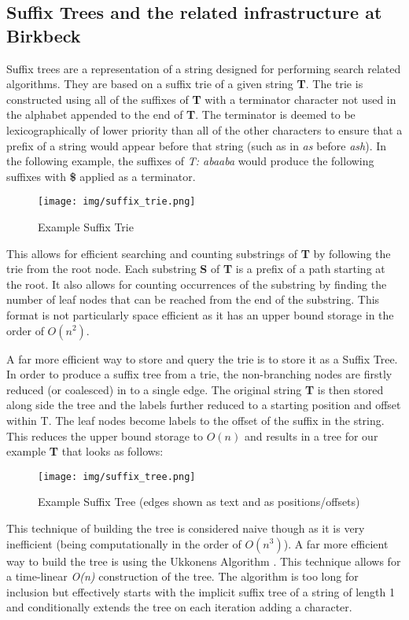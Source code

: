 \documentclass[11pt]{scrartcl}
\begin{document}
\subsection{Suffix Trees and the related infrastructure at Birkbeck}
	Suffix trees \citep{suffix} are a representation of a string designed for performing search related algorithms.  They are based on a suffix trie of a given string \textbf{T}.  The trie is constructed using all of the suffixes of \textbf{T} with a terminator character not used in the alphabet appended to the end of \textbf{T}.  The terminator is deemed to be lexicographically of lower priority than all of the other characters to ensure that a prefix of a string would appear before that string (such as in \textit{as} before \textit{ash}). In the following example, the suffixes of \textit{T: abaaba} would produce the following suffixes with \textbf{\$} applied as a terminator.
	\begin{figure}[h]
		\centering
		\texttt{[image: img/suffix\_trie.png]}
		\caption{Example Suffix Trie}
	\end{figure}
	
	This allows for efficient searching and counting substrings of \textbf{T} by following the trie from the root node.  Each substring \textbf{S} of \textbf{T} is a prefix of a path starting at the root.  It also allows for counting occurrences of the substring by finding the number of leaf nodes that can be reached from the end of the substring.  This format is not particularly space efficient as it has an upper bound storage in the order of \textit{$O(n^{2})$}.
	
	A far more efficient way to store and query the trie is to store it as a Suffix Tree.  In order to produce a suffix tree from a trie, the non-branching nodes are firstly reduced (or coalesced) in to a single edge.  The original string \textbf{T} is then stored along side the tree and the labels further reduced to a starting position and offset within T.  The leaf nodes become labels to the offset of the suffix in the string.  This reduces the upper bound storage to \textit{$O(n)$} and results in a tree for our example \textbf{T} that looks as follows:
	\begin{figure}[h]
		\centering
		\texttt{[image: img/suffix\_tree.png]}
		\caption{Example Suffix Tree (edges shown as text and as positions/offsets)}
	\end{figure}
	
	This technique of building the tree is considered naive though as it is very inefficient (being computationally in the order of \textit{$O(n^{3})$}).  A far more efficient way to build the tree is using the Ukkonens Algorithm \citep{ukkonens}.  This technique allows for a time-linear \textit{O(n)} construction of the tree.  The algorithm is too long for inclusion but effectively starts with the implicit suffix tree of a string of length 1 and conditionally extends the tree on each iteration adding a character.
	
\end{document}
